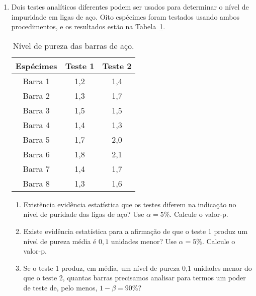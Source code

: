 \documentclass[8pt, a4paper]{article}
\begin{document}
\begin{enumerate}
	\item Dois testes analíticos diferentes podem ser usados para determinar o nível de impuridade em ligas de aço. Oito espécimes foram testados usando ambos procedimentos, e os resultados estão na Tabela~\ref{tab:especimes}.
	\begin{table}[ht]
		\centering
		\begin{tabular}{c|cc}
			\toprule[0.05cm]
			Espécimes & Teste 1 & Teste 2 \\ 
			\midrule[0.025cm]
			Barra 1 & 1,2 & 1,4 \\ 
			Barra 2 & 1,3 & 1,7 \\ 
			Barra 3 & 1,5 & 1,5 \\ 
			Barra 4 & 1,4 & 1,3 \\ 
			Barra 5 & 1,7 & 2,0 \\ 
			Barra 6 & 1,8 & 2,1 \\ 
			Barra 7 & 1,4 & 1,7 \\ 
			Barra 8 & 1,3 & 1,6 \\ 
			\bottomrule[0.05cm]
		\end{tabular}
		\caption{Nível de pureza das barras de aço.} 
		\label{tab:especimes}
	\end{table} 
	\begin{enumerate}
		\item Existência evidência estatística que os testes diferem na indicação no nível de puridade das ligas de aço? Use $\alpha = 5\%$. Calcule o valor-p. 
		\item Existe evidência estatística para a afirmação de que o teste 1 produz um nível de pureza média é $0,1$ unidades menor? Use $\alpha = 5\%$. Calcule o valor-p. 
		\item Se o teste 1 produz, em média, um nível de pureza 0,1 unidades menor do que o teste 2, quantas barras precisamos analisar para termos um poder de teste de, pelo menos, $1-\beta = 90\%$? 
	\end{enumerate}


\end{enumerate}
\end{document}
